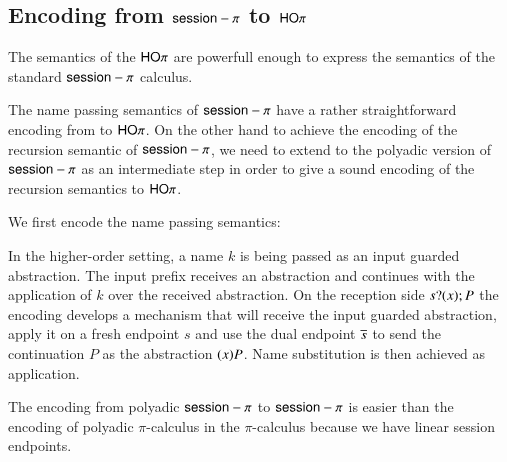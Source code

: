 \subsection{Encoding from $\mathsf{session}-\pi$ to $\mathsf{HO}\pi$}

The semantics of the $\mathsf{HO}\pi$ are powerfull enough to
express the semantics of the standard $\mathsf{session}-\pi$ calculus.

The name passing semantics of $\mathsf{session}-\pi$ have a rather straightforward
encoding from to $\mathsf{HO}\pi$.
On the other hand to achieve the encoding of the recursion semantic
of $\mathsf{session}-\pi$, we need to extend
to the polyadic version of $\mathsf{session}-\pi$ as an intermediate step in order
to give a sound encoding of the recursion semantics to $\mathsf{HO}\pi$.

We first encode the name passing semantics:


In the higher-order setting, a name $k$ is being passed as an input
guarded abstraction. The input prefix receives an abstraction and
continues with the application of $k$ over the received abstraction.
On the reception side $s ? (x) ; P$ 
the encoding develops a mechanism that will receive
the input guarded abstraction, apply it on a fresh endpoint $s$ and use
the dual endpoint $\overline{s}$ to send the continuation $P$ as the abstraction
$(x)P$. Name substitution is then achieved as application.

The encoding from polyadic $\mathsf{session}-\pi$ to $\mathsf{session}-\pi$ is easier than the
encoding of polyadic $\pi$-calculus in the $\pi$-calculus because
we have linear session endpoints.

